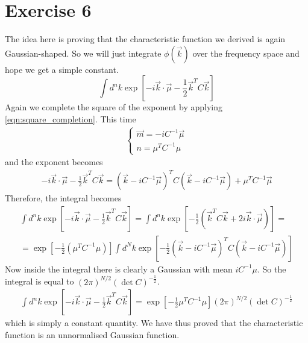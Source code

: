 \documentclass[a4paper,11pt,fleqn]{article}
\begin{document}
\section{Exercise 6}
The idea here is proving that the characteristic function we derived is again Gaussian-shaped.
So we will just integrate $\phi(\vec{k})$ over the frequency space and hope
we get a simple constant.
\begin{equation*}
    \int d^nk \exp{\left[-i\vec{k}\cdot\vec{\mu}-\frac{1}{2}\vec{k}^TC\vec{k}\right]}
\end{equation*}
Again we complete the square of the exponent by applying \ref{eqn:square_completion}.
This time 
\begin{gather*}
    \begin{cases}
        \vec{m} = -iC^{-1}\vec{\mu} \\
        n = \mu^TC^{-1}\mu
    \end{cases}
\end{gather*}
and the exponent becomes
\begin{gather*}
    -i\vec{k}\cdot\vec{\mu}-\frac{1}{2}\vec{k}^TC\vec{k} = (\vec{k}-iC^{-1}\vec{\mu})^TC (\vec{k}-iC^{-1}\vec{\mu}) + \mu^T C^{-1}\vec{\mu}
\end{gather*}
Therefore, the integral becomes 
\begin{gather*}
    \int d^nk \exp{\left[-i\vec{k}\cdot\vec{\mu}-\frac{1}{2}\vec{k}^TC\vec{k}\right]} = \int d^nk \exp{\left[-\frac{1}{2}\left(\vec{k}^TC\vec{k} + 2 i\vec{k}\cdot\vec{\mu} \right)\right]} =\\ 
    = \exp{\left[-\frac{1}{2}\left(\mu^T C^{-1}\mu\right) \right]}\int d^N k \exp{\left[-\frac{1}{2}(\vec{k}-iC^{-1}\vec{\mu})^TC (\vec{k}-iC^{-1}\vec{\mu})\right]}
\end{gather*}
Now inside the integral there is clearly a Gaussian with mean $iC^{-1}\mu$. So the integral
is equal to $(2\pi)^{N/2}(\det{C})^{-\frac{1}{2}}$.
\begin{gather*}
    \int d^nk \exp{\left[-i\vec{k}\cdot\vec{\mu}-\frac{1}{2}\vec{k}^TC\vec{k}\right]} = \exp{\left[-\frac{1}{2}\mu^T C^{-1}\mu \right]} (2\pi)^{N/2}(\det{C})^{-\frac{1}{2}}
\end{gather*}
which is simply a constant quantity. We have thus proved that the characteristic
function is an unnormalised Gaussian function.
\end{document}
